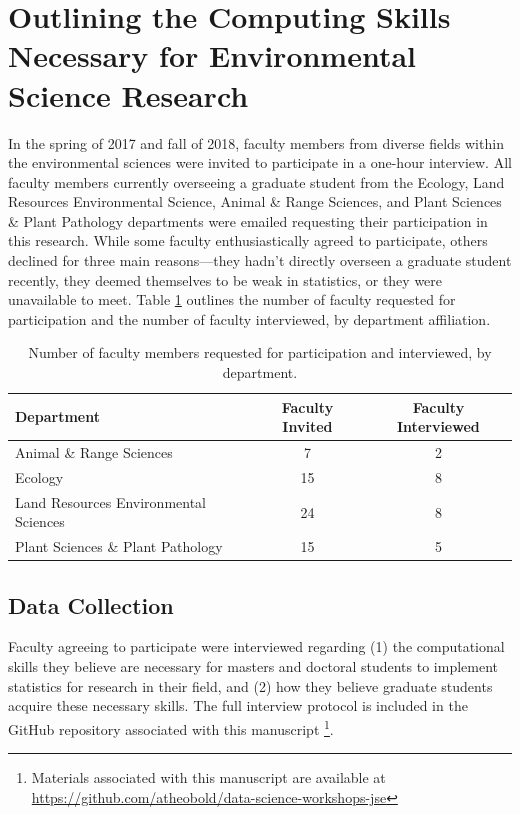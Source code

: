 \documentclass[12pt]{article}
\begin{document}
\section{Outlining the Computing Skills Necessary for Environmental Science Research}
\label{sec:faculty}

\quad In the spring of 2017 and fall of 2018, faculty members from diverse 
fields within the environmental sciences were invited to participate in a 
one-hour interview. All faculty members currently overseeing a graduate student
from the Ecology, Land Resources Environmental Science, Animal \& Range 
Sciences, and Plant Sciences \& Plant Pathology departments were emailed 
requesting their participation in this research. While some faculty 
enthusiastically agreed to participate, others declined for three main 
reasons---they hadn't directly overseen a graduate student recently, they deemed
themselves to be weak in statistics, or they were unavailable to meet. Table 
\ref{tab:faculty} outlines the number of faculty requested for participation and
the number of faculty interviewed, by department affiliation. 

{
\begin{table}[h!]
\centering
\begin{tabular}{lcc}
\hline
Department & Faculty Invited & Faculty Interviewed  \\
\hline
Animal \& Range Sciences & 7 & 2 \\
Ecology & 15 & 8 \\
Land Resources Environmental Sciences & 24 & 8 \\
Plant Sciences \& Plant Pathology &  15 & 5 \\ 
\hline
\end{tabular}
\caption{Number of faculty members requested for participation and interviewed,
by department.}
\label{tab:faculty}
\end{table}
}

\subsection{Data Collection}  

\quad Faculty agreeing to participate were interviewed regarding (1) the 
computational skills they believe are necessary for masters and doctoral 
students to implement statistics for research in their field, and (2) how they 
believe graduate students acquire these necessary skills. The full interview 
protocol is included in the GitHub repository associated with this manuscript 
\footnote{Materials associated with this manuscript are available at 
\href{https://github.com/atheobold/data-science-workshops-jse}{https://github.com/atheobold/data-science-workshops-jse}}.  
\end{document}
